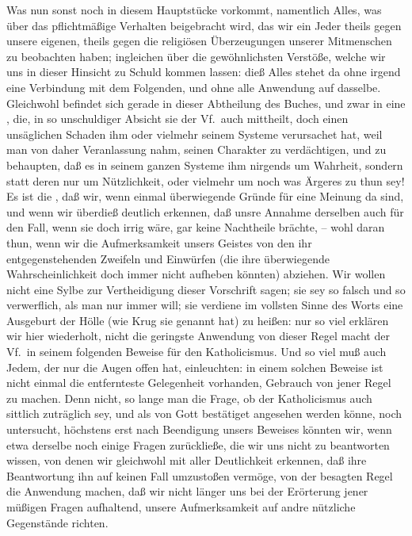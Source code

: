 Was nun sonst noch in diesem Hauptstücke vorkommt, namentlich Alles, was  über das pflichtmäßige Verhalten beigebracht wird, das wir ein Jeder theils gegen unsere eigenen, theils gegen die religiösen Überzeugungen unserer Mitmenschen zu beobachten haben; ingleichen über die gewöhnlichsten Verstöße, welche wir uns in dieser Hinsicht zu Schuld kommen lassen: dieß Alles stehet da ohne irgend eine Verbindung mit dem Folgenden, und ohne alle Anwendung auf dasselbe. Gleichwohl befindet sich gerade in dieser Abtheilung des Buches, und zwar in  eine , die, in so unschuldiger Absicht sie der Vf.\ auch mittheilt, doch einen unsäglichen Schaden ihm oder vielmehr seinem Systeme verursachet hat, weil man von daher Veranlassung nahm, seinen Charakter zu verdächtigen, und zu behaupten, daß es in seinem ganzen Systeme ihm nirgends um Wahrheit, sondern statt deren nur um Nützlichkeit, oder vielmehr um noch was Ärgeres zu thun sey! Es ist die , daß wir, wenn einmal überwiegende Gründe für eine Meinung da sind, und wenn wir überdieß deutlich erkennen, daß unsre Annahme derselben auch für den Fall, wenn sie doch irrig wäre, gar keine Nachtheile brächte, -- wohl daran thun, wenn wir die Aufmerksamkeit unsers Geistes von den ihr entgegenstehenden Zweifeln und Einwürfen (die ihre überwiegende Wahrscheinlichkeit doch immer nicht aufheben könnten) abziehen. Wir wollen nicht eine Sylbe zur Vertheidigung dieser Vorschrift sagen; sie sey so falsch und  so verwerflich, als man nur immer will; sie verdiene im vollsten Sinne des Worts eine Ausgeburt der Hölle (wie Krug sie genannt hat) zu heißen: nur so viel erklären wir hier wiederholt, nicht die geringste Anwendung von dieser Regel macht der Vf.\ in seinem folgenden Beweise für den Katholicismus. Und so viel muß auch Jedem, der nur die Augen offen hat, einleuchten: in einem solchen Beweise ist nicht einmal die entfernteste Gelegenheit vorhanden, Gebrauch von jener Regel zu machen. Denn nicht, so lange man die Frage, ob der Katholicismus auch sittlich zuträglich sey, und als von Gott bestätiget angesehen werden könne, noch untersucht, höchstens erst nach Beendigung unsers Beweises könnten wir, wenn etwa derselbe noch einige Fragen zurückließe, die wir uns nicht zu beantworten wissen, von denen wir gleichwohl mit aller Deutlichkeit erkennen, daß ihre Beantwortung ihn auf keinen Fall umzustoßen vermöge, von der besagten Regel die Anwendung machen, daß wir nicht länger uns bei der Erörterung jener müßigen Fragen aufhaltend, unsere Aufmerksamkeit auf andre nützliche Gegenstände richten. \par
